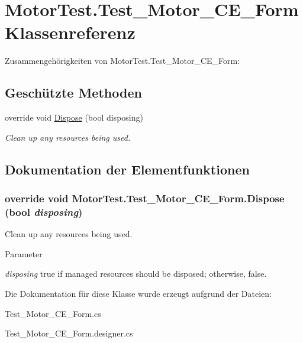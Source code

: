 \hypertarget{class_motor_test_1_1_test___motor___c_e___form}{
\section{MotorTest.Test\_\-Motor\_\-CE\_\-Form Klassenreferenz}
\label{class_motor_test_1_1_test___motor___c_e___form}
}


Zusammengehörigkeiten von MotorTest.Test\_\-Motor\_\-CE\_\-Form:\subsection*{Geschützte Methoden}
\begin{DoxyCompactItemize}
\item 
override void \hyperlink{class_motor_test_1_1_test___motor___c_e___form_aed039c8b2c800c4acbd63f0c69955258}{Dispose} (bool disposing)
\begin{DoxyCompactList}\small\item\em Clean up any resources being used. \item\end{DoxyCompactList}\end{DoxyCompactItemize}


\subsection{Dokumentation der Elementfunktionen}
\hypertarget{class_motor_test_1_1_test___motor___c_e___form_aed039c8b2c800c4acbd63f0c69955258}{
\subsubsection[{Dispose}]{\setlength{\rightskip}{0pt plus 5cm}override void MotorTest.Test\_\-Motor\_\-CE\_\-Form.Dispose (bool {\em disposing})}}
\label{class_motor_test_1_1_test___motor___c_e___form_aed039c8b2c800c4acbd63f0c69955258}


Clean up any resources being used. 


\begin{DoxyParams}{Parameter}
\item[{\em disposing}]true if managed resources should be disposed; otherwise, false.\end{DoxyParams}


Die Dokumentation für diese Klasse wurde erzeugt aufgrund der Dateien:\begin{DoxyCompactItemize}
\item 
Test\_\-Motor\_\-CE\_\-Form.cs\item 
Test\_\-Motor\_\-CE\_\-Form.designer.cs\end{DoxyCompactItemize}
